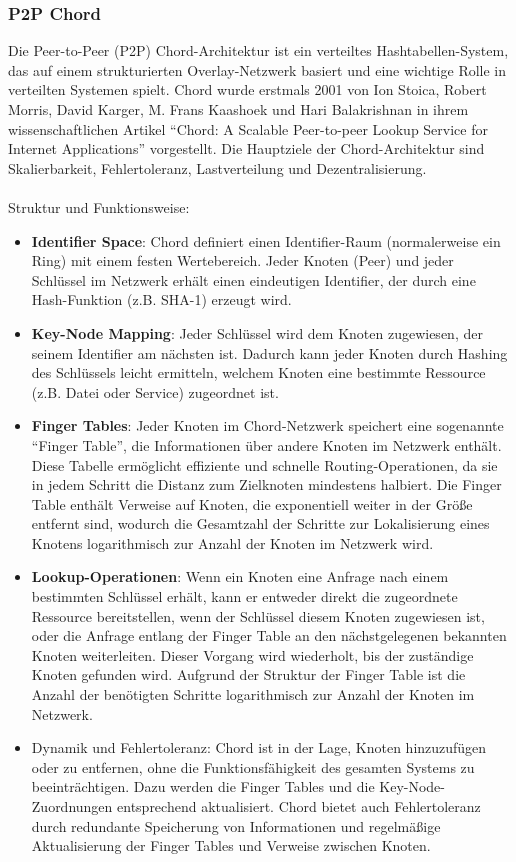 \subsubsection{P2P Chord}
Die Peer-to-Peer (P2P) Chord-Architektur ist ein verteiltes Hashtabellen-System, das auf einem strukturierten Overlay-Netzwerk basiert und eine wichtige Rolle in verteilten Systemen spielt. Chord wurde erstmals 2001 von Ion Stoica, Robert Morris, David Karger, M. Frans Kaashoek und Hari Balakrishnan in ihrem wissenschaftlichen Artikel \enquote{Chord: A Scalable Peer-to-peer Lookup Service for Internet Applications} vorgestellt. Die Hauptziele der Chord-Architektur sind Skalierbarkeit, Fehlertoleranz, Lastverteilung und Dezentralisierung.
\\\\
Struktur und Funktionsweise:
\begin{itemize} 
\item \textbf{Identifier Space}: Chord definiert einen Identifier-Raum (normalerweise ein Ring) mit einem festen Wertebereich. Jeder Knoten (Peer) und jeder Schlüssel im Netzwerk erhält einen eindeutigen Identifier, der durch eine Hash-Funktion (z.B. SHA-1) erzeugt wird.
\item \textbf{Key-Node Mapping}: Jeder Schlüssel wird dem Knoten zugewiesen, der seinem Identifier am nächsten ist. Dadurch kann jeder Knoten durch Hashing des Schlüssels leicht ermitteln, welchem Knoten eine bestimmte Ressource (z.B. Datei oder Service) zugeordnet ist.
\item \textbf{Finger Tables}: Jeder Knoten im Chord-Netzwerk speichert eine sogenannte \enquote{Finger Table}, die Informationen über andere Knoten im Netzwerk enthält. Diese Tabelle ermöglicht effiziente und schnelle Routing-Operationen, da sie in jedem Schritt die Distanz zum Zielknoten mindestens halbiert. Die Finger Table enthält Verweise auf Knoten, die exponentiell weiter in der Größe entfernt sind, wodurch die Gesamtzahl der Schritte zur Lokalisierung eines Knotens logarithmisch zur Anzahl der Knoten im Netzwerk wird.
\item \textbf{Lookup-Operationen}: Wenn ein Knoten eine Anfrage nach einem bestimmten Schlüssel erhält, kann er entweder direkt die zugeordnete Ressource bereitstellen, wenn der Schlüssel diesem Knoten zugewiesen ist, oder die Anfrage entlang der Finger Table an den nächstgelegenen bekannten Knoten weiterleiten. Dieser Vorgang wird wiederholt, bis der zuständige Knoten gefunden wird. Aufgrund der Struktur der Finger Table ist die Anzahl der benötigten Schritte logarithmisch zur Anzahl der Knoten im Netzwerk.
\item Dynamik und Fehlertoleranz: Chord ist in der Lage, Knoten hinzuzufügen oder zu entfernen, ohne die Funktionsfähigkeit des gesamten Systems zu beeinträchtigen. Dazu werden die Finger Tables und die Key-Node-Zuordnungen entsprechend aktualisiert. Chord bietet auch Fehlertoleranz durch redundante Speicherung von Informationen und regelmäßige Aktualisierung der Finger Tables und Verweise zwischen Knoten.
\end{itemize} 

